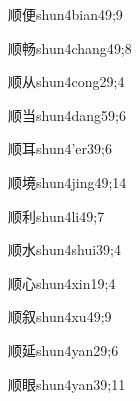 \begin{verbete}{顺便}{shun4bian4}{9;9}
\end{verbete}

\begin{verbete}{顺畅}{shun4chang4}{9;8}
\end{verbete}

\begin{verbete}{顺从}{shun4cong2}{9;4}
\end{verbete}

\begin{verbete}{顺当}{shun4dang5}{9;6}
\end{verbete}

\begin{verbete}{顺耳}{shun4'er3}{9;6}
\end{verbete}

\begin{verbete}{顺境}{shun4jing4}{9;14}
\end{verbete}

\begin{verbete}{顺利}{shun4li4}{9;7}
\end{verbete}

\begin{verbete}{顺水}{shun4shui3}{9;4}
\end{verbete}

\begin{verbete}{顺心}{shun4xin1}{9;4}
\end{verbete}

\begin{verbete}{顺叙}{shun4xu4}{9;9}
\end{verbete}

\begin{verbete}{顺延}{shun4yan2}{9;6}
\end{verbete}

\begin{verbete}{顺眼}{shun4yan3}{9;11}
\end{verbete}

